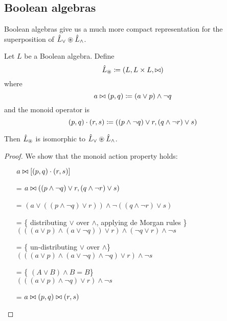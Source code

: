 \subsection{Boolean algebras}

Boolean algebras give us a much more compact representation for the
superposition of $\hat{L}_\vee \circledast \hat{L}_\wedge$.

\begin{prop}
  Let $L$ be a Boolean algebra. Define
  $$\hat{L}_\circledast \coloneqq (L,L \times L,\bowtie)$$
  where
  $$a \bowtie (p, q) \coloneqq (a \vee p) \wedge \neg q$$
  and the monoid operator is
  $$(p, q) \cdot (r, s) \coloneqq ((p \wedge \neg q) \vee r, (q \wedge \neg r) \vee s)$$

  Then $\hat{L}_\circledast$ is isomorphic to $\hat{L}_\vee \circledast \hat{L}_\wedge$.
\end{prop}
\ifproofs
\begin{proof}
  We show that the monoid action property holds:
  \begin{itemize}
    \item[ ]$a \bowtie \left[(p, q) \cdot (r, s)\right]$
    \item[=]$a \bowtie ((p \wedge \neg q) \vee r, (q \wedge \neg r) \vee s)$
    \item[=]$
      \left(
        a \vee
        \left(
          \left(
            p \wedge \neg q
          \right)
          \vee r
        \right)
      \right)
      \wedge \neg
      \left(
        \left(
          q \wedge \neg r
        \right)
        \vee s
      \right)$
    \item[=]\{ distributing $\vee$ over $\wedge$, applying de Morgan rules \}\\
      $
      \left(
        \left(
          \left(
            a \vee p
          \right)
          \wedge
          \left(
            a \vee \neg q
          \right)
        \right)
        \vee r
      \right)
      \wedge
      \left(
        \neg q \vee r
      \right)
      \wedge
      \neg s
      $
    \item[=]\{ un-distributing $\vee$ over $\wedge $\}\\
      $
      \left(
        \left(
          \left(
            a \vee p
          \right)
          \wedge
          \left(
            a \vee \neg q
          \right)
          \wedge
          \neg q
        \right)
        \vee r
      \right)
      \wedge
      \neg s
      $
    \item[=]\{ $(A \vee B) \wedge B = B$\}\\
      $
      \left(
        \left(
          \left(
            a \vee p
          \right)
          \wedge
          \neg q
        \right)
        \vee r
      \right)
      \wedge
      \neg s
      $
    \item[=]$a \bowtie (p, q) \bowtie (r, s)$
  \end{itemize}
\end{proof}
\fi


